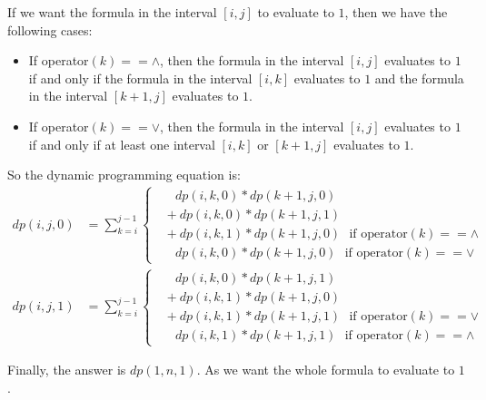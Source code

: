 If we want the formula in the interval $[i,j]$ to evaluate to $1$, then we have the following cases:
\begin{itemize}
    \item If operator$(k) == \land$, then the formula in the interval $[i,j]$ evaluates to $1$ if and only if the formula in the interval $[i,k]$ evaluates to $1$ and the formula in the interval $[k+1,j]$ evaluates to $1$.
    \item If operator$(k) == \lor$, then the formula in the interval $[i,j]$ evaluates to $1$ if and only if at least one interval $[i,k]$ or $[k+1,j]$ evaluates to $1$.
\end{itemize}

So the dynamic programming equation is:
\begin{equation}
    \begin{aligned}
        dp(i,j,0) &= \sum_{k=i}^{j-1} \left\{
            \begin{array}{ll}
                &\ \ \ dp(i,k,0) * dp(k+1,j,0) \\
                &+\ dp(i,k,0) * dp(k+1,j,1) \\
                &+\ dp(i,k,1) * dp(k+1,j,0) \ \ \ \text{if operator} (k) == \land\\
                &\ \ \ dp(i,k,0) * dp(k+1,j,0) \ \ \ \text{if operator} (k) == \lor
            \end{array}
        \right.\\
        dp(i,j,1) &= \sum_{k=i}^{j-1} \left\{
            \begin{array}{ll}
                &\ \ \ dp(i,k,0) * dp(k+1,j,1) \\
                &+\ dp(i,k,1) * dp(k+1,j,0) \\
                &+\ dp(i,k,1) * dp(k+1,j,1) \ \ \ \text{if operator} (k) == \lor\\
                &\ \ \ dp(i,k,1) * dp(k+1,j,1) \ \ \ \text{if operator} (k) == \land
            \end{array}
        \right.
    \end{aligned}
\end{equation}
    
    Finally, the answer is $dp(1,n,1)$. As we want the whole formula to evaluate to $1$.\\



